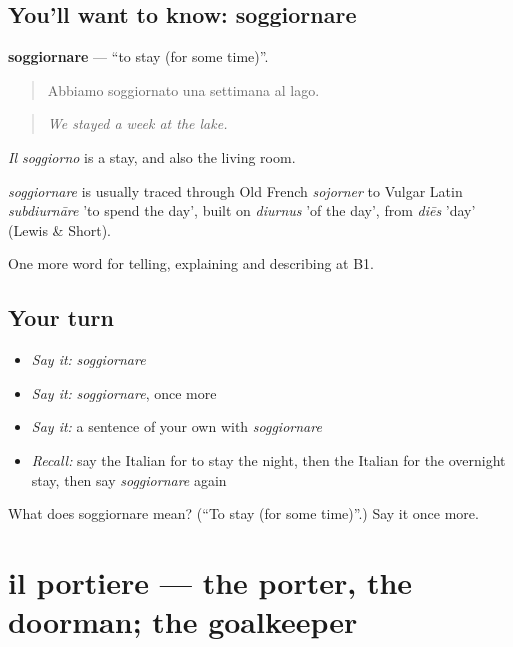 \subsection*{You'll want to know: soggiornare}
\textbf{soggiornare} — \textquotedblleft{}to stay (for some time)\textquotedblright{}.

\begin{quote}
Abbiamo soggiornato una settimana al lago.
\end{quote}

\begin{quote}
\emph{We stayed a week at the lake.}
\end{quote}

\emph{Il soggiorno} is a stay, and also the living room.

\begin{cousinweb}
\emph{soggiornare} is usually traced through Old French \emph{sojorner} to Vulgar Latin \emph{subdiurnāre} 'to spend the day', built on \emph{diurnus} 'of the day', from \emph{diēs} 'day' (Lewis \& Short).
\end{cousinweb}

\begin{grammarlens}[title={What you've built}]
One more word for telling, explaining and describing at B1.
\end{grammarlens}

\subsection*{Your turn}
\begin{itemize}
\raggedright
  \item \emph{Say it:} \emph{soggiornare}
  \item \emph{Say it:} \emph{soggiornare}, once more
  \item \emph{Say it:} a sentence of your own with \emph{soggiornare}
  \item \emph{Recall:} say the Italian for to stay the night, then the Italian for the overnight stay, then say \emph{soggiornare} again
\end{itemize}

\begin{tcolorbox}[breakable,colback=teal!4,colframe=teal!35!black,title={Before you move on}]
What does soggiornare mean? (\textquotedblleft{}To stay (for some time)\textquotedblright{}.) Say it once more.
\end{tcolorbox}
\section[il portiere]{il portiere — the porter, the doorman; the goalkeeper}

